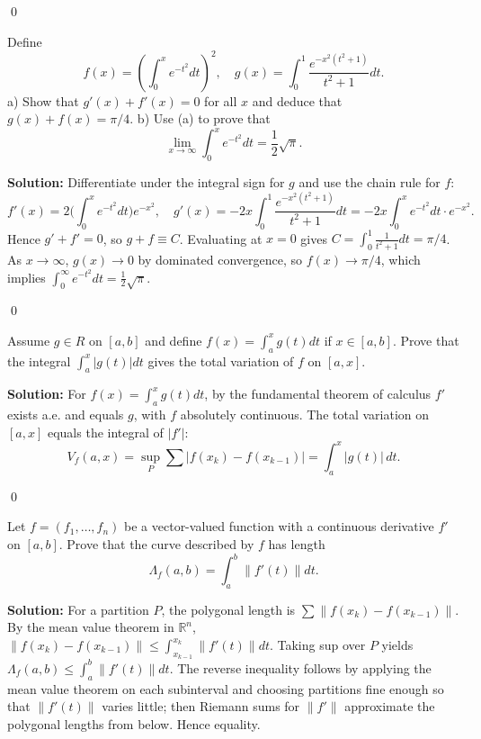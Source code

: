\qed
\begin{problembox}
Define 
\[f(x) = \left( \int_0^x e^{-t^2} dt \right)^2, \quad g(x) = \int_0^1 \frac{e^{-x^2(t^2+1)}}{t^2 + 1} dt.\]
a) Show that $g'(x) + f'(x) = 0$ for all $x$ and deduce that $g(x) + f(x) = \pi / 4$.
b) Use (a) to prove that 
\[\lim_{x \to \infty} \int_0^x e^{-t^2} dt = \frac{1}{2} \sqrt{\pi}.\]
\end{problembox}

\noindent\textbf{Solution:}
Differentiate under the integral sign for $g$ and use the chain rule for $f$:
\[f'(x)=2\Big(\int_0^x e^{-t^2}dt\Big)e^{-x^2},\quad g'(x)=-2x\int_0^1 \frac{e^{-x^2(t^2+1)}}{t^2+1}dt=-2x\int_0^x e^{-t^2}dt\cdot e^{-x^2}.
\]
Hence $g'+f'=0$, so $g+f\equiv C$. Evaluating at $x=0$ gives $C=\int_0^1\frac{1}{t^2+1}dt=\pi/4$. As $x\to\infty$, $g(x)\to0$ by dominated convergence, so $f(x)\to \pi/4$, which implies $\int_0^\infty e^{-t^2}dt=\tfrac12\sqrt\pi$.




\qed
\begin{problembox}
Assume $g \in R$ on $[a, b]$ and define $f(x) = \int_a^x g(t) dt$ if $x \in [a, b]$. Prove that the integral $\int_a^x |g(t)| dt$ gives the total variation of $f$ on $[a, x]$.
\end{problembox}

\noindent\textbf{Solution:}
For $f(x)=\int_a^x g(t)dt$, by the fundamental theorem of calculus $f'$ exists a.e. and equals $g$, with $f$ absolutely continuous. The total variation on $[a,x]$ equals the integral of $|f'|$:
\[V_f(a,x)=\sup_{P}\sum|f(x_k)-f(x_{k-1})|=\int_a^x |g(t)|\,dt.
\]




\qed
\begin{problembox}
Let $f = (f_1, \ldots, f_n)$ be a vector-valued function with a continuous derivative $f'$ on $[a, b]$. Prove that the curve described by $f$ has length 
\[\Lambda_f(a, b) = \int_a^b \|f'(t)\| dt.\]
\end{problembox}

\noindent\textbf{Solution:}
For a partition $P$, the polygonal length is $\sum\|f(x_k)-f(x_{k-1})\|$. By the mean value theorem in $\mathbb{R}^n$, $\|f(x_k)-f(x_{k-1})\|\le \int_{x_{k-1}}^{x_k}\|f'(t)\|dt$. Taking sup over $P$ yields $\Lambda_f(a,b)\le\int_a^b\|f'(t)\|dt$. The reverse inequality follows by applying the mean value theorem on each subinterval and choosing partitions fine enough so that $\|f'(t)\|$ varies little; then Riemann sums for $\|f'\|$ approximate the polygonal lengths from below. Hence equality.




